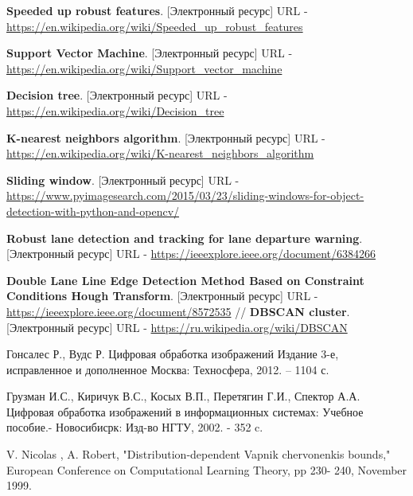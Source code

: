\begin{thebibliography}{2}
	\textbf{Speeded up robust features}. [Электронный ресурс] URL - 
	\href{https://en.wikipedia.org/wiki/Speeded\_up_robust\_features}{https://en.wikipedia.org/wiki/Speeded\_up\_robust\_features}
	
	\textbf{Support Vector Machine}. [Электронный ресурс] URL - 
	\href{https://en.wikipedia.org/wiki/Support\_vector\_machine}{https://en.wikipedia.org/wiki/Support\_vector\_machine}
	
	\textbf{Decision tree}. [Электронный ресурс] URL - 
	\href{https://en.wikipedia.org/wiki/Decision\_tree}{https://en.wikipedia.org/wiki/Decision\_tree}
	
	\textbf{K-nearest neighbors algorithm}. [Электронный ресурс] URL - 
	\href{https://en.wikipedia.org/wiki/K-nearest\_neighbors\_algorithm}{https://en.wikipedia.org/wiki/K-nearest\_neighbors\_algorithm}
	
	\textbf{Sliding window}. [Электронный ресурс] URL - 
	\href{https://www.pyimagesearch.com/2015/03/23/sliding-windows-for-object-detection-with-python-and-opencv/}{https://www.pyimagesearch.com/2015/03/23/sliding-windows-for-object-detection-with-python-and-opencv/}
	
	\textbf{Robust lane detection and tracking for lane departure warning}. [Электронный ресурс] URL - 
	\href{https://ieeexplore.ieee.org/document/6384266}{https://ieeexplore.ieee.org/document/6384266}
	
	\textbf{Double Lane Line Edge Detection Method Based on
		Constraint Conditions Hough Transform}. [Электронный ресурс] URL - 
	\href{https://ieeexplore.ieee.org/document/8572535}{https://ieeexplore.ieee.org/document/8572535}
	//
	\textbf{DBSCAN cluster}. [Электронный ресурс] URL - 
	\href{https://ru.wikipedia.org/wiki/DBSCAN}{https://ru.wikipedia.org/wiki/DBSCAN}
	
	Гонсалес Р., Вудс Р.
	Цифровая обработка изображений
	Издание 3-е, исправленное и дополненное
	Москва: Техносфера, 2012. – 1104 с. 
	
	Грузман И.С., Киричук В.С., Косых В.П., Перетягин Г.И., Спектор А.А. Цифровая обработка изображений в информационных системах: Учебное пособие.- Новосибисрк: Изд-во НГТУ, 2002. - 352 c.
	
	V. Nicolas , A. Robert, "Distribution-dependent Vapnik chervonenkis
	bounds," European Conference on Computational Learning Theory, pp 230-
	240, November 1999.
	
\end{thebibliography}		  		 		